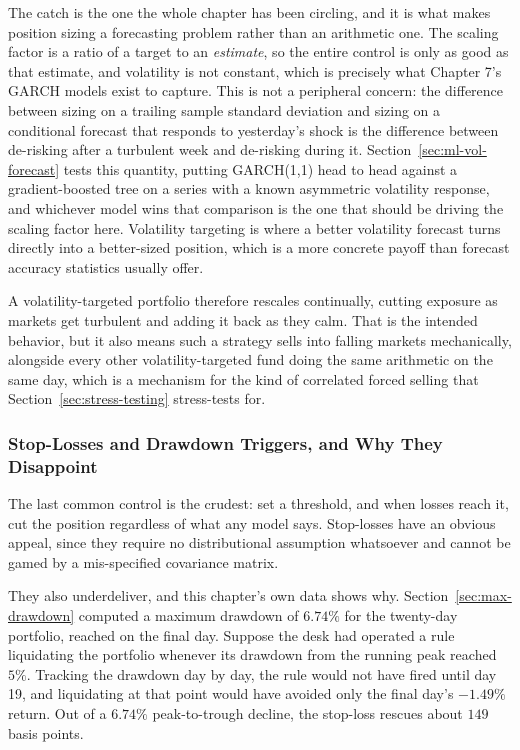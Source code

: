 \documentclass[../ai_in_finance]{subfiles}
\begin{document}
The catch is the one the whole chapter has been circling, and it is what makes position sizing a forecasting problem rather than an arithmetic one. The scaling factor is a ratio of a target to an \emph{estimate}, so the entire control is only as good as that estimate, and volatility is not constant, which is precisely what Chapter 7's GARCH models exist to capture. This is not a peripheral concern: the difference between sizing on a trailing sample standard deviation and sizing on a conditional forecast that responds to yesterday's shock is the difference between de-risking after a turbulent week and de-risking during it. Section~\ref{sec:ml-vol-forecast} tests this quantity, putting GARCH(1,1) head to head against a gradient-boosted tree on a series with a known asymmetric volatility response, and whichever model wins that comparison is the one that should be driving the scaling factor here. Volatility targeting is where a better volatility forecast turns directly into a better-sized position, which is a more concrete payoff than forecast accuracy statistics usually offer.

A volatility-targeted portfolio therefore rescales continually, cutting exposure as markets get turbulent and adding it back as they calm. That is the intended behavior, but it also means such a strategy sells into falling markets mechanically, alongside every other volatility-targeted fund doing the same arithmetic on the same day, which is a mechanism for the kind of correlated forced selling that Section~\ref{sec:stress-testing} stress-tests for.

\subsubsection*{Stop-Losses and Drawdown Triggers, and Why They Disappoint}

The last common control is the crudest: set a threshold, and when losses reach it, cut the position regardless of what any model says. Stop-losses have an obvious appeal, since they require no distributional assumption whatsoever and cannot be gamed by a mis-specified covariance matrix.

They also underdeliver, and this chapter's own data shows why. Section~\ref{sec:max-drawdown} computed a maximum drawdown of $6.74\%$ for the twenty-day portfolio, reached on the final day. Suppose the desk had operated a rule liquidating the portfolio whenever its drawdown from the running peak reached $5\%$. Tracking the drawdown day by day, the rule would not have fired until day 19, and liquidating at that point would have avoided only the final day's $-1.49\%$ return. Out of a $6.74\%$ peak-to-trough decline, the stop-loss rescues about $149$ basis points.
\end{document}
